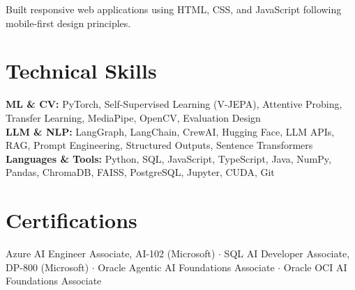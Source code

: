 \documentclass[a4paper,10pt]{article}
\begin{document}
\begin{points}
  \item Built responsive web applications using HTML, CSS, and JavaScript following mobile-first design principles.
\end{points}

\section{Technical Skills}
{\small
\textbf{ML \& CV:} PyTorch, Self-Supervised Learning (V-JEPA), Attentive Probing, Transfer Learning, MediaPipe, OpenCV, Evaluation Design\\
\textbf{LLM \& NLP:} LangGraph, LangChain, CrewAI, Hugging Face, LLM APIs, RAG, Prompt Engineering, Structured Outputs, Sentence Transformers\\
\textbf{Languages \& Tools:} Python, SQL, JavaScript, TypeScript, Java, NumPy, Pandas, ChromaDB, FAISS, PostgreSQL, Jupyter, CUDA, Git}

\section{Certifications}
{\small
Azure AI Engineer Associate, AI-102 (Microsoft) $\cdot$ SQL AI Developer Associate, DP-800 (Microsoft) $\cdot$ Oracle Agentic AI Foundations Associate $\cdot$ Oracle OCI AI Foundations Associate}
\end{document}
